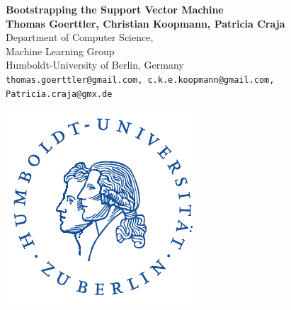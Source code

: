 \documentclass[a1,portrait]{a0poster}
\begin{document}

\setlength{\linewidth}{1450pt}

\begin{minipage}[t]{0.75\linewidth}
\huge \color{hu} \textbf{Bootstrapping the Support Vector Machine} \color{Black}\\[0.5cm] %
\large \textbf{Thomas Goerttler, Christian Koopmann, Patricia Craja}\\[0.5cm] %
\large Department of Computer Science,\\
\large Machine Learning Group\\[0.4cm] %
\large Humboldt-University of Berlin, Germany\\
\normalsize \texttt{thomas.goerttler@gmail.com, c.k.e.koopmann@gmail.com, Patricia.craja@gmx.de}\\
\end{minipage}
%
\begin{minipage}[t]{0.24\linewidth}
\vspace{-50pt}
\raggedleft
\includegraphics[width=\linewidth]{husiegel_bw.pdf}%
\vfill
\end{minipage}
\end{document}
